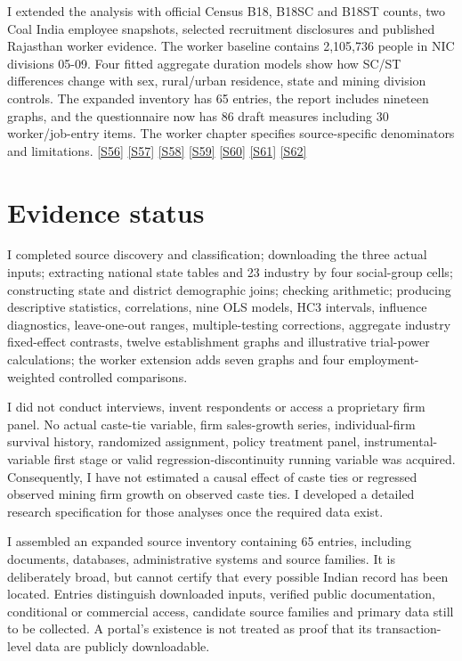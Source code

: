 \documentclass[11pt,a4paper]{report}
\begin{document}
I extended the analysis with official Census B18, B18SC and B18ST counts, two Coal India employee snapshots, selected recruitment disclosures and published Rajasthan worker evidence. The worker baseline contains 2,105,736 people in NIC divisions 05-09. Four fitted aggregate duration models show how SC/\allowbreak{}ST differences change with sex, rural/\allowbreak{}urban residence, state and mining division controls. The expanded inventory has 65 entries, the report includes nineteen graphs, and the questionnaire now has 86 draft measures including 30 worker/\allowbreak{}job-entry items. The worker chapter specifies source-specific denominators and limitations. \hyperlink{S56}{[S56]} \hyperlink{S57}{[S57]} \hyperlink{S58}{[S58]} \hyperlink{S59}{[S59]} \hyperlink{S60}{[S60]} \hyperlink{S61}{[S61]} \hyperlink{S62}{[S62]}

\section{Evidence status}
I completed source discovery and classification; downloading the three actual inputs; extracting national state tables and 23 industry by four social-group cells; constructing state and district demographic joins; checking arithmetic; producing descriptive statistics, correlations, nine OLS models, HC3 intervals, influence diagnostics, leave-one-out ranges, multiple-testing corrections, aggregate industry fixed-effect contrasts, twelve establishment graphs and illustrative trial-power calculations; the worker extension adds seven graphs and four employment-weighted controlled comparisons.

I did not conduct interviews, invent respondents or access a proprietary firm panel. No actual caste-tie variable, firm sales-growth series, individual-firm survival history, randomized assignment, policy treatment panel, instrumental-variable first stage or valid regression-discontinuity running variable was acquired. Consequently, I have not estimated a causal effect of caste ties or regressed observed mining firm growth on observed caste ties. I developed a detailed research specification for those analyses once the required data exist.

I assembled an expanded source inventory containing 65 entries, including documents, databases, administrative systems and source families. It is deliberately broad, but cannot certify that every possible Indian record has been located. Entries distinguish downloaded inputs, verified public documentation, conditional or commercial access, candidate source families and primary data still to be collected. A portal's existence is not treated as proof that its transaction-level data are publicly downloadable.
\end{document}
